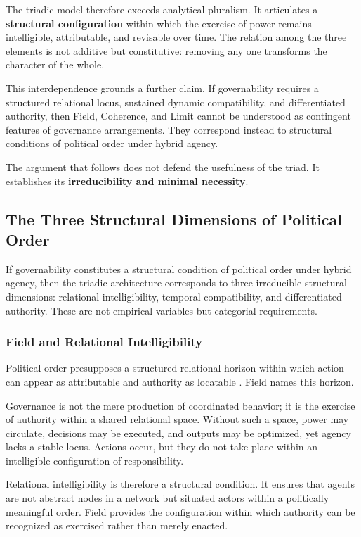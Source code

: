 \documentclass[12pt]{article}
\begin{document}
The triadic model therefore exceeds analytical pluralism. It articulates a \textbf{structural configuration} within which the exercise of power remains intelligible, attributable, and revisable over time. The relation among the three elements is not additive but constitutive: removing any one transforms the character of the whole.

This interdependence grounds a further claim. If governability requires a structured relational locus, sustained dynamic compatibility, and differentiated authority, then Field, Coherence, and Limit cannot be understood as contingent features of governance arrangements. They correspond instead to structural conditions of political order under hybrid agency.

The argument that follows does not defend the usefulness of the triad. It establishes its \textbf{irreducibility and minimal necessity}.

\subsection{The Three Structural Dimensions of Political Order}


If governability constitutes a structural condition of political order under hybrid agency, then the triadic architecture corresponds to three irreducible structural dimensions: relational intelligibility, temporal compatibility, and differentiated authority. These are not empirical variables but categorial requirements.

\subsubsection{Field and Relational Intelligibility}


Political order presupposes a structured relational horizon within which action can appear as attributable and authority as locatable \citep{Arendt1958}. Field names this horizon.

Governance is not the mere production of coordinated behavior; it is the exercise of authority within a shared relational space. Without such a space, power may circulate, decisions may be executed, and outputs may be optimized, yet agency lacks a stable locus. Actions occur, but they do not take place within an intelligible configuration of responsibility.

Relational intelligibility is therefore a structural condition. It ensures that agents are not abstract nodes in a network but situated actors within a politically meaningful order. Field provides the configuration within which authority can be recognized as exercised rather than merely enacted.
\end{document}
